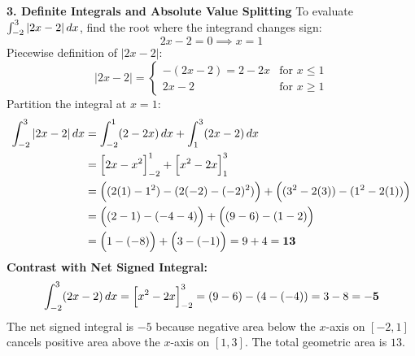 \textbf{3. Definite Integrals and Absolute Value Splitting}
To evaluate $\int_{-2}^3 |2x - 2| \,dx$, find the root where the integrand changes sign:
\begin{equation*}
2x - 2 = 0 \implies x = 1
\end{equation*}
Piecewise definition of $|2x - 2|$:
\begin{equation*}
|2x - 2| = \begin{cases} -(2x - 2) = 2 - 2x & \text{for } x \le 1 \\ 2x - 2 & \text{for } x \ge 1 \end{cases}
\end{equation*}
Partition the integral at $x = 1$:
\begin{align*}
\int_{-2}^3 |2x - 2| \,dx &= \int_{-2}^1 (2 - 2x) \,dx + \int_1^3 (2x - 2) \,dx \\
&= \Big[ 2x - x^2 \Big]_{-2}^1 + \Big[ x^2 - 2x \Big]_1^3 \\
&= \Big( (2(1) - 1^2) - (2(-2) - (-2)^2) \Big) + \Big( (3^2 - 2(3)) - (1^2 - 2(1)) \Big) \\
&= \Big( (2 - 1) - (-4 - 4) \Big) + \Big( (9 - 6) - (1 - 2) \Big) \\
&= \Big( 1 - (-8) \Big) + \Big( 3 - (-1) \Big) = 9 + 4 = \mathbf{13}
\end{align*}
\textbf{Contrast with Net Signed Integral:}
\begin{equation*}
\int_{-2}^3 (2x - 2) \,dx = \Big[ x^2 - 2x \Big]_{-2}^3 = (9 - 6) - (4 - (-4)) = 3 - 8 = \mathbf{-5}
\end{equation*}
The net signed integral is $-5$ because negative area below the $x$-axis on $[-2, 1]$ cancels positive area above the $x$-axis on $[1, 3]$. The total geometric area is $13$.

